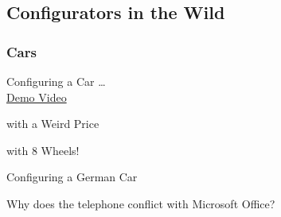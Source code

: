 \usetikzlibrary{arrows,positioning}

\subsection{Configurators in the Wild}

\subsubsection*{Cars}

\begin{frame}{\myframetitle}
	\begin{fancycolumns}[t,columns=3,widths={33,22}]
		\begin{exampletight}{Configuring a Car \ldots}
			\\\centering
			\href{https://www.youtube.com/watch?v=OpSaA1Nt56w&list=PL4hJhdKDPIxha8So7muX2zfNUU8NBoiu3&index=13}{Demo Video}
		\end{exampletight}
	\nextcolumn
		\begin{exampletight}{with a Weird Price}
			\centering{}
		\end{exampletight}
	\nextcolumn
		\begin{exampletight}{with 8 Wheels!}
		\end{exampletight}
	\end{fancycolumns}
	\begin{fancycolumns}[columns=3,widths={20,60},animation=none]
	\nextcolumn
	\nextcolumn
	\end{fancycolumns}
\end{frame}

\begin{frame}{\myframetitle}
	\begin{fancycolumns}[widths={70,30}]
		\begin{exampletight}{Configuring a German Car}
		\end{exampletight}
	\nextcolumn
		\begin{note}{}
			Why does the telephone conflict with Microsoft Office?
		\end{note}
	\end{fancycolumns}
\end{frame}

